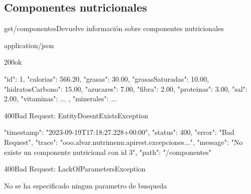 \subsection{Componentes nutricionales}

\begin{apiRoute}{get}{/componentes}{Devuelve información sobre componentes nutricionales}
	
	\begin{routeParameter}
	\end{routeParameter}
	
	\begin{routeResponse}{application/json}
		\begin{routeResponseItem}{200}{ok}
			\begin{routeResponseItemBody}
{
    "id": 1,
    "calorias": 566.20,
    "grasas": 30.00,
    "grasasSaturadas": 10.00,
    "hidratosCarbono": 15.00,
    "azucares": 7.00,
    "fibra": 2.00,
    "proteinas": 3.00,
    "sal": 2.00,
    "vitaminas": {
        ...
    },
    "minerales": {
        ...
    }
}
			\end{routeResponseItemBody}
		\end{routeResponseItem}
		\begin{routeResponseItem}{400}{Bad Request: EntityDoesntExistsException}
			\begin{routeResponseItemBody}
{
    "timestamp": "2023-09-19T17:18:27.228+00:00",
    "status": 400,
    "error": "Bad Request",
    "trace": "ooo.alvar.nutrimenu.apirest.excepciones...",
    "message": "No existe un componente nutricional con id 3",
    "path": "/componentes"
}
			\end{routeResponseItemBody}
		\end{routeResponseItem}
		\begin{routeResponseItem}{400}{Bad Request: LackOfParametersException}
			\begin{routeResponseItemBody}
No se ha especificado ningun parametro de busqueda
			\end{routeResponseItemBody}
		\end{routeResponseItem}
	\end{routeResponse}
\end{apiRoute}

